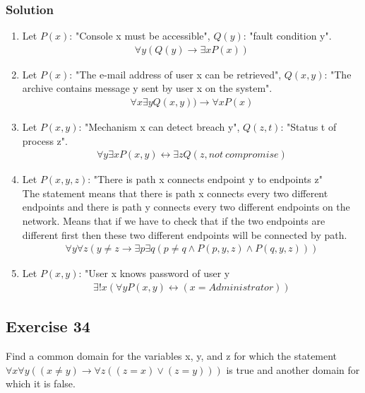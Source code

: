 \documentclass{article}
\begin{document}
\subsubsection*{Solution}
\begin{enumerate} [label = (\alph*)]
    \item Let $P(x)$: "Console x must be accessible", $Q(y)$: "fault condition y".
          \begin{align}
              \forall y(Q(y) \rightarrow \exists xP(x)) \nonumber
          \end{align}
    \item Let $P(x)$: "The e-mail address of user x can be retrieved", $Q(x, y)$: "The archive contains message y sent by user x on the system".
          \begin{align}
              \forall x\exists yQ(x, y)) \rightarrow \forall xP(x) \nonumber
          \end{align}
    \item Let $P(x, y)$: "Mechanism x can detect breach y", $Q(z, t)$: "Status t of process z".
          \begin{align}
              \forall y\exists xP(x, y) \leftrightarrow \exists zQ(z, not\ compromise) \nonumber
          \end{align}
    \item Let $P(x, y, z)$: "There is path x connects endpoint y to endpoints z"\\
          The statement means that there is path x connects every two different endpoints and there is path y connects every two different endpoints on the network. Means that if we have to check that if the two endpoints are different first then these two different endpoints will be connected by path.
          \begin{align}
              \forall y\forall z(y \ne z \rightarrow \exists p \exists q(p \ne q \land P(p, y, z) \land P(q, y, z))) \nonumber
          \end{align}
    \item Let $P(x, y)$: "User x knows password of user y
          \begin{align}
              \exists !x(\forall yP(x, y) \leftrightarrow (x = Administrator)) \nonumber
          \end{align}
\end{enumerate}
\subsection*{Exercise 34}
Find a common domain for the variables x, y, and z for which the statement $\forall x\forall y((x \ne y) \rightarrow \forall z((z = x) \lor (z = y)))$ is true and another domain for which it is false.
\end{document}

